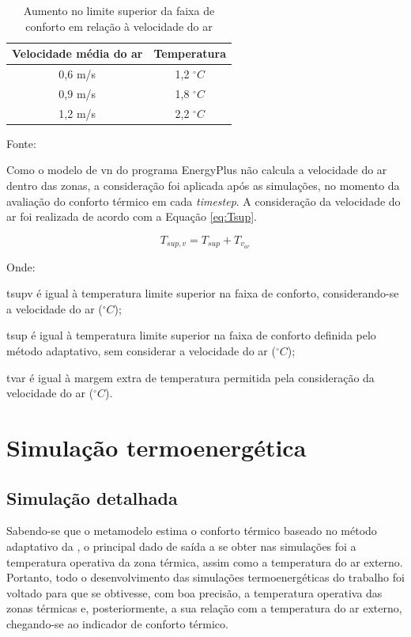 \documentclass[brazil,hardcopy,openany]{ufscthesis} %
\newcommand{\source}[1]{\small \caption*{Fonte: {#1}} } %
\begin{document}
\begin{table}[h]
	\centering
	\caption{Aumento no limite superior da faixa de conforto em relação à velocidade do ar}
	\label{table:var}
	\begin{tabular}{|c |c |}
		\hline
		\textbf{Velocidade média do ar} & \textbf{Temperatura} \\
		\hline
		0,6 m/s & 1,2 $^{\circ}C$ \\
		\hline
		0,9 m/s & 1,8 $^{\circ}C$ \\
		\hline
		1,2 m/s & 2,2 $^{\circ}C$ \\
		\hline 
	\end{tabular}
	\source{}
\end{table}

Como o modelo de \acrlong{vn} do programa EnergyPlus não calcula a velocidade do ar dentro das zonas, a consideração foi aplicada após as simulações, no momento da avaliação do conforto térmico em cada \textit{timestep}. A consideração da velocidade do ar foi realizada de acordo com a Equação \ref{eq:Tsup}.

\begin{equation}
\label{eq:Tsup}
T_{sup,v} = T_{sup} + T_{v_{ar}}
\end{equation}

Onde:

\gls{tsupv} é igual à temperatura limite superior na faixa de conforto, considerando-se a velocidade do ar ($^{\circ}C$);

\gls{tsup} é igual à temperatura limite superior na faixa de conforto definida pelo método adaptativo, sem considerar a velocidade do ar ($^{\circ}C$);

\gls{tvar} é igual à margem extra de temperatura permitida pela consideração da velocidade do ar ($^{\circ}C$).
\\

\section{Simulação termoenergética}

\subsection{Simulação detalhada}

Sabendo-se que o metamodelo estima o conforto térmico baseado no método adaptativo da , o principal dado de saída a se obter nas simulações foi a temperatura operativa da zona térmica, assim como a temperatura do ar externo. Portanto, todo o desenvolvimento das simulações termoenergéticas do trabalho foi voltado para que se obtivesse, com boa precisão, a temperatura operativa das zonas térmicas e, posteriormente, a sua relação com a temperatura do ar externo, chegando-se ao indicador de conforto térmico.
\end{document}
